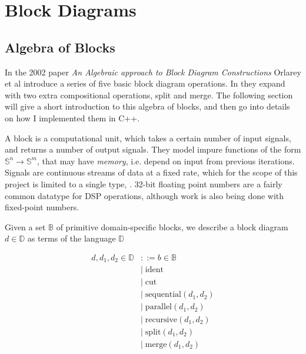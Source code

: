 \chapter{Block Diagrams}
\label{chap:blocks}

\newcommand{\Ident}{\ensuremath{\textrm{ident}}}
\newcommand{\Cut}{\ensuremath{\textrm{cut}}}
\newcommand{\Sequential}{\ensuremath{\textrm{sequential}}}
\newcommand{\Parallel}{\ensuremath{\textrm{parallel}}}
\newcommand{\Recursive}{\ensuremath{\textrm{recursive}}}
\newcommand{\Split}{\ensuremath{\textrm{split}}}
\newcommand{\Merge}{\ensuremath{\textrm{merge}}}
\newcommand{\Ins}{\ensuremath{\textbf{ins}}}
\newcommand{\Outs}{\ensuremath{\textbf{outs}}}
\newcommand{\Sig}{\ensuremath{\mathbb{S}}}


\section{Algebra of Blocks}

In the 2002 paper \emph{An Algebraic approach to Block Diagram Constructions}\autocite{orlarey2002} Orlarey et al introduce a series of five
basic block diagram operations. In \autocite{orlarey2004} they expand with two extra compositional
operations, split and merge. The following section will give a short introduction to this algebra of blocks,
and then go into details on how I implemented them in C++.

A block is a computational unit, which takes a certain number of input signals, and returns a number of
output signals. They model impure functions of the form $\mathbb{S}^n\rightarrow \mathbb{S}^m$, that may have
\emph{memory}, i.e. depend on input from previous iterations. Signals are continuous streams of
data at a fixed rate, which for the scope of this project is limited to a single type,
. 32-bit floating point numbers are a fairly common datatype for DSP operations,
although work is also being done with fixed-point numbers.

Given a set $\mathbb{B}$ of primitive domain-specific blocks, we describe a block diagram
$d \in \mathbb{D}$ as terms of the language $\mathbb{D}$

\begin{align*}
  d, d_1, d_2 \in \mathbb{D} & ::= b \in \mathbb{B}      \\
                             & |\; \Ident                \\
                             & |\; \Cut                  \\
                             & |\; \Sequential(d_1, d_2) \\
                             & |\; \Parallel(d_1, d_2)   \\
                             & |\; \Recursive(d_1, d_2)  \\
                             & |\; \Split(d_1, d_2)      \\
                             & |\; \Merge(d_1, d_2)      \\
\end{align*}

